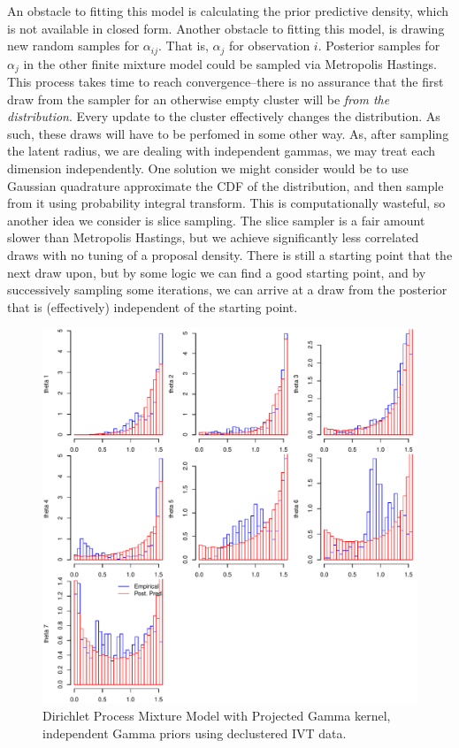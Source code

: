 An obstacle to fitting this model is calculating the prior predictive density,
  which is not available in closed form.  Another obstacle to fitting this
  model, is drawing new random samples for $\alpha_{ij}$.  That is, $\alpha_j$
  for observation $i$.  Posterior samples for $\alpha_j$ in the other finite
  mixture model could be sampled via Metropolis Hastings.  This process takes
  time to reach convergence--there is no assurance that the first draw from
  the sampler for an otherwise empty cluster will be \emph{from the distribution}.
  Every update to the cluster effectively changes the distribution.  As such,
  these draws will have to be perfomed in some other way.  As, after sampling the
  latent radius, we are dealing with independent gammas, we may treat each dimension
  independently.  One solution we might consider would be to use Gaussian quadrature
  approximate the CDF of the distribution, and then sample from it using probability
  integral transform.  This is computationally wasteful, so another idea we
  consider is slice sampling.  The slice sampler is a fair amount slower than
  Metropolis Hastings, but we achieve significantly less correlated draws with no
  tuning of a proposal density.  There is still a starting point that the next draw
  upon, but by some logic we can find a good starting point, and by successively
  sampling some iterations, we can arrive at a draw from the posterior that is
  (effectively) independent of the starting point.

\begin{figure}[h!]
  \centering
  \label{fig:dpmpg}
  \caption{Dirichlet Process Mixture Model with Projected Gamma kernel, independent Gamma priors
          using declustered IVT data.}
  \includegraphics[width=6in]{./images/dpmpg_emp_v_pred_decluster}
\end{figure}

